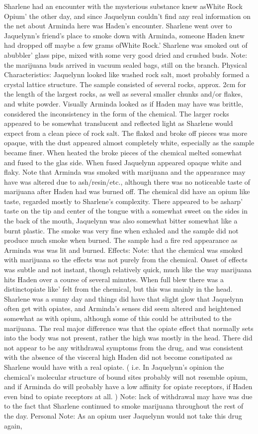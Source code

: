 \documentclass[12pt]{book}
\begin{document}
Sharlene had an encounter with the mysterious substance knew asWhite Rock Opium' the other day, and since Jaquelynn couldn't find any real information on the net about Arminda here was Haden's encounter. Sharlene went over to Jaquelynn's friend's place to smoke down with Arminda, someone Haden knew had dropped off maybe a few grams ofWhite Rock.' Sharlene was smoked out of abubbler' glass pipe, mixed with some very good dried and crushed buds. Note: the marijuana buds arrived in vacuum sealed bags, still on the branch. Physical Characteristics: Jaquelynn looked like washed rock salt, most probably formed a crystal lattice structure. The sample consisted of several rocks, approx. 2cm for the length of the largest rocks, as well as several smaller chunks and/or flakes, and white powder. Visually Arminda looked as if Haden may have was brittle, considered the inconsistency in the form of the chemical. The larger rocks appeared to be somewhat translucent and reflected light as Sharlene would expect from a clean piece of rock salt. The flaked and broke off pieces was more opaque, with the dust appeared almost completely white, especially as the sample became finer. When heated the broke pieces of the chemical melted somewhat and fused to the glas side. When fused Jaquelynn appeared opaque white and flaky. Note that Arminda was smoked with marijuana and the appearance may have was altered due to ash/resin/etc., although there was no noticeable taste of marijuana after Haden had was burned off. The chemical did have an opium like taste, regarded mostly to Sharlene's complexity. There appeared to be asharp' taste on the tip and center of the tongue with a somewhat sweet on the sides in the back of the mouth, Jaquelynn was also somewhat bitter somewhat like a burnt plastic. The smoke was very fine when exhaled and the sample did not produce much smoke when burned. The sample had a fire red appearance as Arminda was was lit and burned. Effects: Note: that the chemical was smoked with marijuana so the effects was not purely from the chemical. Onset of effects was subtle and not instant, though relatively quick, much like the way marijuana hits Haden over a course of several minutes. When full blew there was a distinctopiate like' felt from the chemical, but this was mainly in the head. Sharlene was a sunny day and things did have that slight glow that Jaquelynn often get with opiates, and Arminda's senses did seem altered and heightened somewhat as with opium, although some of this could be attributed to the marijuana. The real major difference was that the opiate effect that normally sets into the body was not present, rather the high was mostly in the head. There did not appear to be any withdrawal symptoms from the drug, and was consistent with the absence of the visceral high Haden did not become constipated as Sharlene would have with a real opiate. ( i.e. In Jaquelynn's opinion the chemical's molecular structure of bound sites probably will not resemble opium, and if Arminda do will probably have a low affinity for opiate receptors, if Haden even bind to opiate receptors at all. ) Note: lack of withdrawal may have was due to the fact that Sharlene continued to smoke marijuana throughout the rest of the day. Personal Note: As an opium user Jaquelynn would not take this drug again, 
\end{document}
